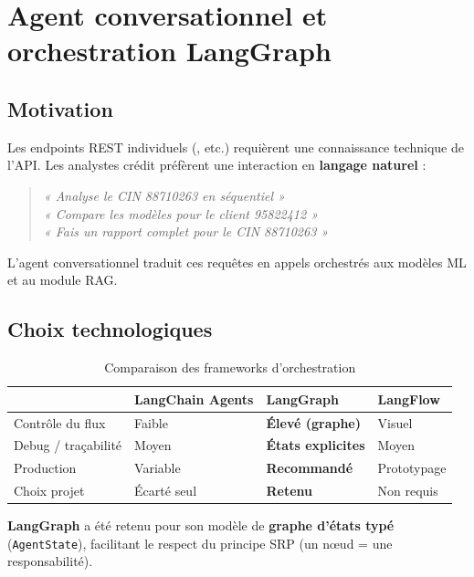 \chapter{Agent conversationnel et orchestration LangGraph}
\label{ch:agent}

\section{Motivation}

Les endpoints REST individuels (, etc.) requièrent une connaissance technique de l'API. Les analystes crédit préfèrent une interaction en \textbf{langage naturel} :
\begin{quote}
\textit{« Analyse le CIN 88710263 en séquentiel »} \\
\textit{« Compare les modèles pour le client 95822412 »} \\
\textit{« Fais un rapport complet pour le CIN 88710263 »}
\end{quote}

L'agent conversationnel traduit ces requêtes en appels orchestrés aux modèles ML et au module RAG.

\section{Choix technologiques}

\begin{table}[H]
  \centering
  \caption{Comparaison des frameworks d'orchestration}
  \begin{tabular}{|l|p{4cm}|p{4cm}|p{4cm}|}
    \hline
    & \textbf{LangChain Agents} & \textbf{LangGraph} & \textbf{LangFlow} \\
    \hline
    Contrôle du flux & Faible & \textbf{Élevé (graphe)} & Visuel \\
    \hline
    Debug / traçabilité & Moyen & \textbf{États explicites} & Moyen \\
    \hline
    Production & Variable & \textbf{Recommandé} & Prototypage \\
    \hline
    Choix projet & Écarté seul & \textbf{Retenu} & Non requis \\
    \hline
  \end{tabular}
\end{table}

\textbf{LangGraph} a été retenu pour son modèle de \textbf{graphe d'états typé} (\texttt{AgentState}), facilitant le respect du principe SRP (un nœud = une responsabilité).

